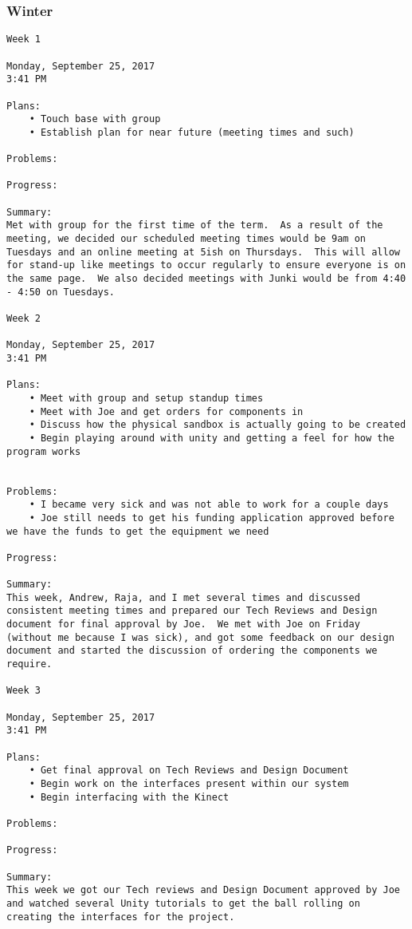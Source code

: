 \subsubsection{Winter}
\begin{lstlisting}
Week 1

Monday, September 25, 2017
3:41 PM

Plans:
	• Touch base with group
	• Establish plan for near future (meeting times and such)

Problems:

Progress:

Summary:
Met with group for the first time of the term.  As a result of the meeting, we decided our scheduled meeting times would be 9am on Tuesdays and an online meeting at 5ish on Thursdays.  This will allow for stand-up like meetings to occur regularly to ensure everyone is on the same page.  We also decided meetings with Junki would be from 4:40 - 4:50 on Tuesdays.

Week 2

Monday, September 25, 2017
3:41 PM

Plans:
	• Meet with group and setup standup times
	• Meet with Joe and get orders for components in
	• Discuss how the physical sandbox is actually going to be created
	• Begin playing around with unity and getting a feel for how the program works
	

Problems:
	• I became very sick and was not able to work for a couple days
	• Joe still needs to get his funding application approved before we have the funds to get the equipment we need

Progress:

Summary:
This week, Andrew, Raja, and I met several times and discussed consistent meeting times and prepared our Tech Reviews and Design document for final approval by Joe.  We met with Joe on Friday (without me because I was sick), and got some feedback on our design document and started the discussion of ordering the components we require.

Week 3

Monday, September 25, 2017
3:41 PM

Plans:
	• Get final approval on Tech Reviews and Design Document
	• Begin work on the interfaces present within our system
	• Begin interfacing with the Kinect

Problems:

Progress:

Summary:
This week we got our Tech reviews and Design Document approved by Joe and watched several Unity tutorials to get the ball rolling on creating the interfaces for the project.


\end{lstlisting}
